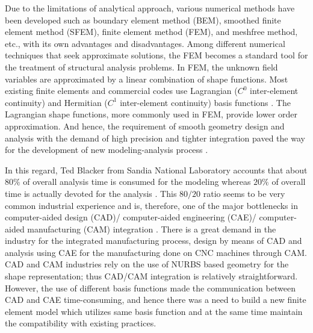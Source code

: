 \documentclass[3p,preprint,12pt]{elsarticle}
\begin{document}
Due to the limitations of analytical approach, various numerical methods have been developed such as boundary element method (BEM), smoothed finite element method (SFEM), finite element method (FEM), and meshfree method, etc., with its own advantages and disadvantages. Among different numerical techniques that seek approximate solutions, the FEM becomes a standard tool for the treatment of structural analysis problems. In FEM, the unknown field variables are approximated by a linear combination of shape functions. Most existing finite elements and commercial codes use Lagrangian ($C^0$ inter-element continuity) and Hermitian ($C^1$ inter-element continuity) basis functions \cite{bhavikatti2005finite}. The Lagrangian shape functions, more commonly used in FEM, provide lower order approximation. And hence, the requirement of smooth geometry design and analysis with the demand of high precision and tighter integration  paved the way for the development of new modeling-analysis process \cite{hughes2005isogeometric}.

In this regard, Ted Blacker from Sandia National Laboratory accounts that about $80\%$ of overall analysis time is consumed for the modeling whereas $20\%$ of overall time is actually devoted for the analysis \cite{hughes2005isogeometric}. This $80/20$ ratio seems to be very common industrial experience and is, therefore, one of the major bottlenecks in computer-aided design (CAD)/ computer-aided engineering (CAE)/ computer-aided manufacturing (CAM) integration \cite{cottrell2009isogeometric}. There is a great demand in the industry for the integrated manufacturing process, design by means of CAD and analysis using CAE for the manufacturing done on CNC machines through CAM. CAD and CAM industries rely on the use of NURBS based geometry \cite{piegl1997monographs, rogers2001introduction} for the shape representation; thus CAD/CAM integration is relatively straightforward. However, the use of different basis functions made the communication between CAD and CAE time-consuming, and hence there was a need to build a new finite element model which utilizes same basis function and at the same time maintain the compatibility with existing practices.
\end{document}
